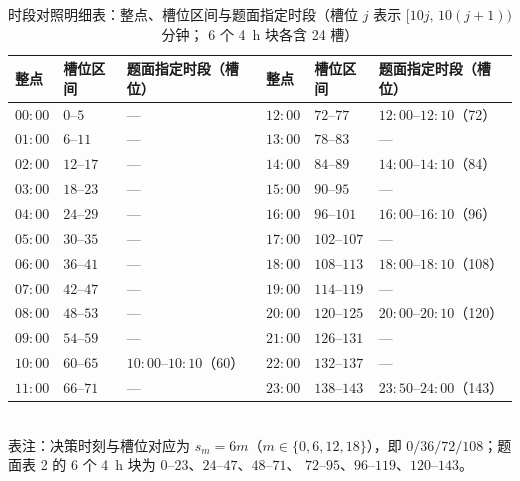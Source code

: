 \begin{table}[htbp]
  \centering
  \caption{时段对照明细表：整点、槽位区间与题面指定时段（槽位 \(j\) 表示 \([10j,\,10(j+1))\) 分钟；
           6 个 4~h 块各含 24 槽）}
  \label{tab:slot-map}
  \footnotesize
  \setlength{\tabcolsep}{4pt}
  \begin{tabular}{C{1.5cm} C{1.7cm} L{3.5cm} C{1.5cm} C{1.7cm} L{3.5cm}}
    \toprule
    整点 & 槽位区间 & 题面指定时段（槽位） & 整点 & 槽位区间 & 题面指定时段（槽位） \\
    \midrule
    \(00{:}00\) & \(0\)--\(5\)   & --- & \(12{:}00\) & \(72\)--\(77\)   & \(12{:}00\)--\(12{:}10\)（72） \\
    \(01{:}00\) & \(6\)--\(11\)  & --- & \(13{:}00\) & \(78\)--\(83\)   & --- \\
    \(02{:}00\) & \(12\)--\(17\) & --- & \(14{:}00\) & \(84\)--\(89\)   & \(14{:}00\)--\(14{:}10\)（84） \\
    \(03{:}00\) & \(18\)--\(23\) & --- & \(15{:}00\) & \(90\)--\(95\)   & --- \\
    \(04{:}00\) & \(24\)--\(29\) & --- & \(16{:}00\) & \(96\)--\(101\)  & \(16{:}00\)--\(16{:}10\)（96） \\
    \(05{:}00\) & \(30\)--\(35\) & --- & \(17{:}00\) & \(102\)--\(107\) & --- \\
    \(06{:}00\) & \(36\)--\(41\) & --- & \(18{:}00\) & \(108\)--\(113\) & \(18{:}00\)--\(18{:}10\)（108） \\
    \(07{:}00\) & \(42\)--\(47\) & --- & \(19{:}00\) & \(114\)--\(119\) & --- \\
    \(08{:}00\) & \(48\)--\(53\) & --- & \(20{:}00\) & \(120\)--\(125\) & \(20{:}00\)--\(20{:}10\)（120） \\
    \(09{:}00\) & \(54\)--\(59\) & --- & \(21{:}00\) & \(126\)--\(131\) & --- \\
    \(10{:}00\) & \(60\)--\(65\) & \(10{:}00\)--\(10{:}10\)（60） & \(22{:}00\) & \(132\)--\(137\) & --- \\
    \(11{:}00\) & \(66\)--\(71\) & --- & \(23{:}00\) & \(138\)--\(143\) & \(23{:}50\)--\(24{:}00\)（143） \\
    \bottomrule
  \end{tabular}
  \\[1ex]
  {\footnotesize 表注：决策时刻与槽位对应为 \(s_m=6m\)（\(m\in\{0,6,12,18\}\)），即
   \(0/36/72/108\)；题面表 2 的 6 个 4~h 块为 \(0\)--\(23\)、\(24\)--\(47\)、\(48\)--\(71\)、
   \(72\)--\(95\)、\(96\)--\(119\)、\(120\)--\(143\)。}
\end{table}

